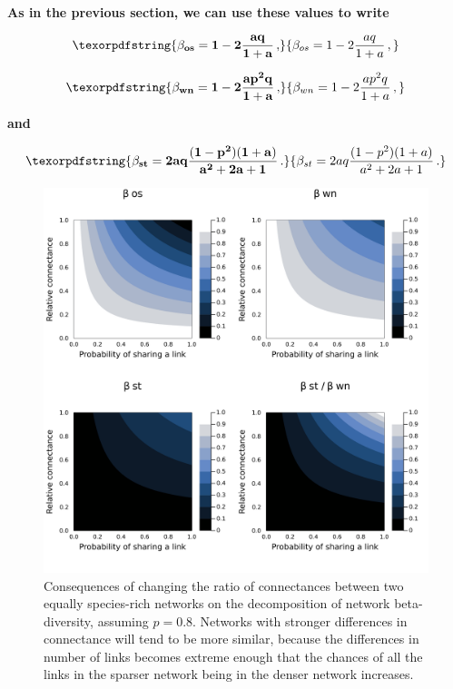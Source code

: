 \documentclass[11pt]{article}
\makeatletter
\def\maxwidth{\ifdim\Gin@nat@width>\linewidth\linewidth
\else\Gin@nat@width\fi}
\let\Oldincludegraphics\includegraphics
\renewcommand{\includegraphics}[1]{\Oldincludegraphics[width=\maxwidth]{#1}}
\providecommand{\DIFaddtex}[1]{{\bf #1}} %
\providecommand{\DIFaddbegin}{\protect\color{blue}} %
\providecommand{\DIFdelbegin}{\protect\color{red}} %
\providecommand{\DIFdelend}{\protect\color{black}} %
\providecommand{\DIFadd}[1]{\texorpdfstring{\DIFaddtex{#1}}{#1}} %
\newcommand{\DIFscaledelfig}{0.5}
\newlength{\DIFdelgraphicswidth} %
\newlength{\DIFdelgraphicsheight} %
\newcommand{\DIFaddincludegraphics}[2][]{{\color{blue}\fbox{\DIFOincludegraphics[#1]{#2}}}} %
\newcommand{\DIFdelincludegraphics}[2][]{%
\sbox{\DIFdelgraphicsbox}{\DIFOincludegraphics[#1]{#2}}%
\settoboxwidth{\DIFdelgraphicswidth}{\DIFdelgraphicsbox} %
\settoboxtotalheight{\DIFdelgraphicsheight}{\DIFdelgraphicsbox} %
\scalebox{\DIFscaledelfig}{%
\parbox[b]{\DIFdelgraphicswidth}{\usebox{\DIFdelgraphicsbox}\\[-\baselineskip] \rule{\DIFdelgraphicswidth}{0em}}\llap{\resizebox{\DIFdelgraphicswidth}{\DIFdelgraphicsheight}{%
\setlength{\unitlength}{\DIFdelgraphicswidth}%
\begin{picture}(1,1)%
\thicklines\linethickness{2pt} %
{\color[rgb]{1,0,0}\put(0,0){\framebox(1,1){}}}%
{\color[rgb]{1,0,0}\put(0,0){\line( 1,1){1}}}%
{\color[rgb]{1,0,0}\put(0,1){\line(1,-1){1}}}%
\end{picture}%
}\hspace*{3pt}}} %
} %
\DeclareRobustCommand{\DIFaddbegin}{\DIFOaddbegin \let\includegraphics\DIFaddincludegraphics} %
\DeclareRobustCommand{\DIFdelbegin}{\DIFOdelbegin \let\includegraphics\DIFdelincludegraphics} %
\DeclareRobustCommand{\DIFdelend}{\DIFOaddend \let\includegraphics\DIFOincludegraphics} %
\makeatother
\begin{document}
\DIFdelbegin %
\DIFdelend \DIFaddbegin \DIFadd{As in the previous section, we can use these values to write
}

\[\DIFadd{\beta_{os} = 1 - 2\frac{aq}{1+a}\,,}\]

\[\DIFadd{\beta_{wn} = 1 - 2\frac{ap^2q}{1+a}\,,}\]

\DIFadd{and
}

\[\DIFadd{\beta_{st} = 2aq\frac{(1-p^2)(1+a)}{a^2 + 2a + 1}\,.}\]

\begin{figure}
\hypertarget{fig:connectance}{%
\centering
\includegraphics{figures/connectance/components.png}
\caption{Consequences of changing the ratio of connectances between two
equally species-rich networks on the decomposition of network
beta-diversity, assuming \(p = 0.8\). Networks with stronger differences
in connectance will tend to be more similar, because the differences in
number of links becomes extreme enough that the chances of all the links
in the sparser network being in the denser network
increases.}\label{fig:connectance}
}

\end{figure}
\end{document}
